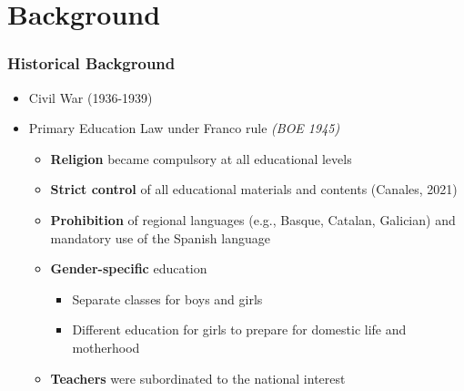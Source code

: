 \documentclass[aspectratio=169]{beamer}
\begin{document}
\section{Background}

\begin{frame}
\frametitle{Historical Background}
\begin{itemize}
\item Civil War (1936-1939)
\medskip
\item Primary Education Law under Franco rule \textit{(BOE 1945)}
\medskip
    \begin{itemize}
    \item \textbf{Religion} became compulsory at all educational levels
    \medskip
    \item \textbf{Strict control} of all educational materials and contents (Canales, 2021)
    \medskip
    \item  \textbf{Prohibition} of regional languages (e.g., Basque, Catalan, Galician) and mandatory use of the Spanish language
    \medskip
    \item \textbf{Gender-specific} education
        \medskip
    \begin{itemize}
    \item Separate classes for boys and girls
    \medskip
     \item Different education for girls to prepare for domestic life and motherhood
\end{itemize}
        \medskip
     \item \textbf{Teachers} were subordinated to the national interest
       \medskip
    \end{itemize}
\end{itemize}
\end{frame}

   
\end{document}

